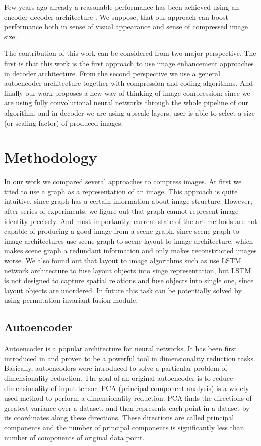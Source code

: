 Few years ago already a reasonable performance has been achieved using an encoder-decoder architecture \cite{Theis_Shi_Cunningham_Huszar_2017}. We suppose, that our approach can boost performance both in sense of visual appearance and sense of compressed image size.

The contribution of this work can be considered from two major perspective. The first is that this work is the first approach to use image enhancement approaches in decoder architecture. From the second perspective we use a general autoencoder architecture together with compression and coding algorithms. And finally our work proposes a new way of thinking of image compression: since we are using fully convolutional neural networks through the whole pipeline of our algorithm, and in decoder we are using upscale layers, user is able to select a size (or scaling factor) of produced images.

\chapter{Methodology}

In our work we compared several approaches to compress images. At first we tried to use a graph as a representation of an image. This approach is quite intuitive, since graph has a certain information about image structure. However, after series of experiments, we figure out that graph cannot represent image identity precisely. And most importantly, current state of the art methods are not capable of producing a good image from a scene graph, since scene graph to image architectures use scene graph to scene layout to image architecture, which makes scene graph a redundant information and only makes reconstructed images worse. We also found out that layout to image algorithms such as \cite{Zhao_Meng_Yin_Sigal_2019} use LSTM network architecture to fuse layout objects into singe representation, but LSTM is not designed to capture spatial relations and fuse objects into single one, since layout objects are unordered. In future this task can be potentially solved by using permutation invariant fusion module.

\section{Autoencoder}

Autoencoder is a popular architecture for neural networks. It has been first introduced in \cite{HinSal06} and proven to be a powerful tool in dimensionality reduction tasks. Basically, autoencoders were introduced to solve a particular problem of dimensionality reduction. The goal of an original autoencoder is to reduce dimensionality of input tensor. PCA (principal component analysis) is a widely used method to perform a dimensionality reduction. PCA finds the directions of greatest variance over a dataset, and then represents each point in a dataset by its coordinates along these directions. These directions are called principal components and the number of principal components is significantly less than number of components of original data point.

